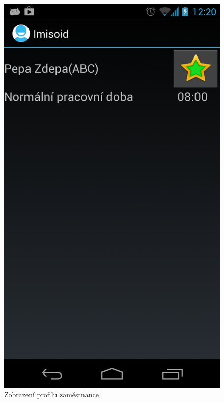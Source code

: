 \documentclass{diplomka}
\begin{document}
\begin{figure}[H]
\begin{minipage}{.45\textwidth}
 \includegraphics[width=.9\linewidth]{scr/emp.png}
   \caption{Zobrazení profilu zaměstnance}
  \label{fig:emp}
\end{minipage}
\end{figure}
\end{document}

